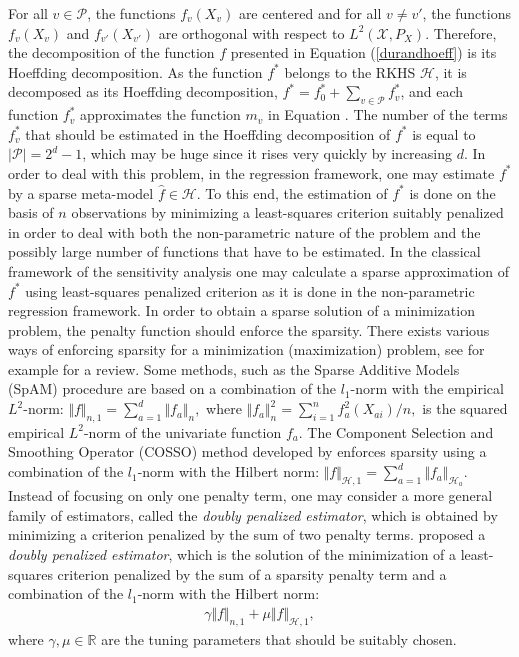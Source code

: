 For all $v\in\mathcal{P}$, the functions $f_v(X_v)$ are centered and for all $v\neq v'$, the functions $f_v(X_v)$ and $f_{v'}(X_{v'})$ are orthogonal with respect to $L^2(\mathcal{X},P_X)$. Therefore, the decomposition of the function $f$ presented in Equation (\ref{durandhoeff}) is its Hoeffding decomposition. 
As the function $f^*$ belongs to the RKHS $\mathcal{H}$, it is decomposed as its Hoeffding decomposition, $f^*=f^*_0+\sum_{v\in\mathcal{P}}f^*_v$, and each function $f^*_v$ approximates the function $m_v$ in Equation .
The number of the terms $f^*_v$ that should be estimated in the Hoeffding decomposition of $f^*$ is equal to $\vert\mathcal{P}\vert=2^d-1$, which may be huge since it rises very quickly by increasing $d$. 
In order to deal with this problem, in the regression framework, one may estimate $f^*$ by a sparse meta-model $\widehat{f}\in\mathcal{H}$. To this end, the estimation of $f^*$ is done on the basis of $n$ observations by minimizing a least-squares criterion suitably penalized in order to deal with both the non-parametric nature of the problem and the possibly large number of functions that have to be estimated. 
In the classical framework of the sensitivity analysis one may calculate a sparse approximation of $f^*$ using least-squares penalized criterion as it is done in the non-parametric regression framework. 
In order to obtain a sparse solution of a minimization problem, the penalty function should enforce the sparsity. 
There exists various ways of enforcing sparsity for a minimization (maximization) problem, see for example \citet{Hastie:2015:SLS:2834535} for a review. Some methods, such as the Sparse Additive Models (SpAM) procedure \citep{Ravikumar,NIPS2008_3616} are based on a combination of the $l_1$-norm with the empirical $L^2$-norm: 
$\Vert f\Vert_{n,1}=\sum_{a=1}^d\Vert f_a\Vert_n,$ where $\Vert f_a\Vert_n^2=\sum_{i=1}^nf_a^2(X_{ai})/n,$ is the squared empirical $L^2$-norm of the univariate function $f_a$.
The Component Selection and Smoothing Operator (COSSO) method developed by \citet{lin2006} enforces sparsity using a combination of the $l_1$-norm with the Hilbert norm: $\Vert f\Vert_{\mathcal{H},1}=\sum_{a=1}^d\Vert f_a\Vert_{\mathcal{H}_a}$.
Instead of focusing on only one penalty term, one may consider a more general family of estimators, called the \textit{doubly penalized estimator}, which is obtained by minimizing a criterion penalized by the sum of two penalty terms. \citet{NIPS2009_3688,Raskutti:2012:MRS:2503308.2188398} proposed a \textit{doubly penalized estimator}, which is the solution of the minimization of a least-squares criterion penalized by the sum of a sparsity penalty term and a combination of the $l_1$-norm with the Hilbert norm:
\begin{align}
\label{doubpen}
\gamma\Vert f\Vert_{n,1}+\mu\Vert f\Vert_{\mathcal{H},1},
\end{align}
where $\gamma, \mu\in\mathbb{R}$ are the tuning parameters that should be suitably chosen.
 
